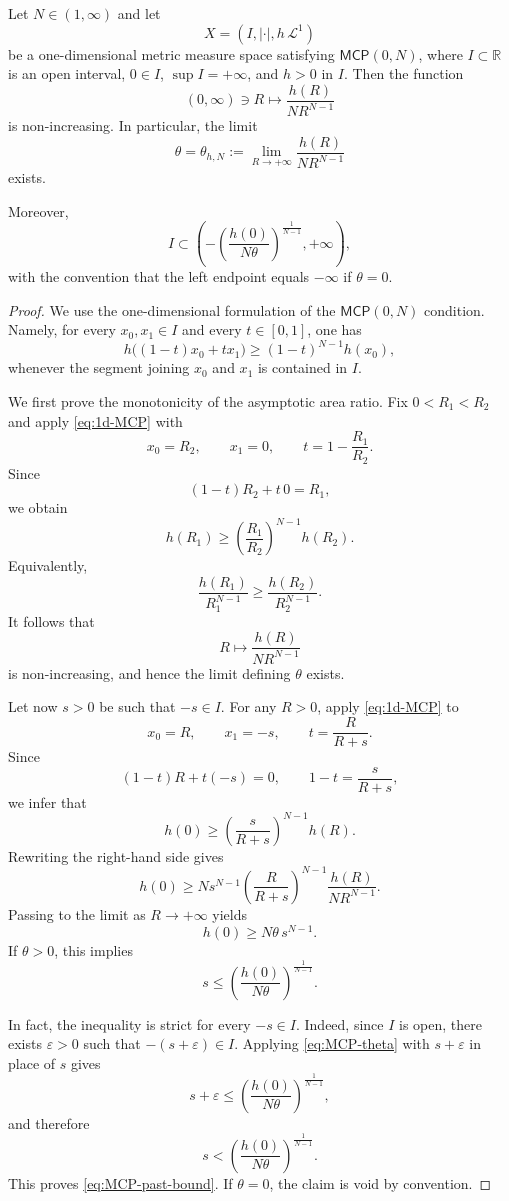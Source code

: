 \documentclass[10pt,a4paper]{amsart}
\newcommand{\MCP}{\mathsf{MCP}}
\begin{document}
\begin{lemma}\label{lem:MCP-asymptotic-bound}
Let $N\in(1,\infty)$ and let
\[
X=(I,|\cdot|,h\,\mathcal L^1)
\]
be a one-dimensional metric measure space satisfying $\MCP(0,N)$,
where $I\subset\mathbb R$ is an open interval, $0\in I$,
$\sup I=+\infty$, and $h>0$ in $I$.
Then the function
\[
(0,\infty)\ni R\longmapsto
\frac{h(R)}{N R^{N-1}}
\]
is non-increasing. In particular, the limit
\[
\theta=\theta_{h,N}
:=
\lim_{R\to+\infty}\frac{h(R)}{N R^{N-1}}
\]
exists.

Moreover,
\begin{equation}\label{eq:MCP-past-bound}
I\subset
\left(
-\left(\frac{h(0)}{N\theta}\right)^{\frac1{N-1}},
+\infty
\right),
\end{equation}
with the convention that the left endpoint equals $-\infty$ if
$\theta=0$.
\end{lemma}

\begin{proof}
We use the one-dimensional formulation of the $\MCP(0,N)$ condition.
Namely, for every $x_0,x_1\in I$ and every $t\in[0,1]$, one has
\begin{equation}\label{eq:1d-MCP}
h\bigl((1-t)x_0+t x_1\bigr)
\geq
(1-t)^{N-1}h(x_0),
\end{equation}
whenever the segment joining $x_0$ and $x_1$ is contained in $I$.

We first prove the monotonicity of the asymptotic area ratio. Fix
$0<R_1<R_2$ and apply \eqref{eq:1d-MCP} with
\[
x_0=R_2,\qquad x_1=0,
\qquad
t=1-\frac{R_1}{R_2}.
\]
Since
\[
(1-t)R_2+t\,0=R_1,
\]
we obtain
\[
h(R_1)
\geq
\left(\frac{R_1}{R_2}\right)^{N-1}h(R_2).
\]
Equivalently,
\[
\frac{h(R_1)}{R_1^{N-1}}
\geq
\frac{h(R_2)}{R_2^{N-1}}.
\]
It follows that
\[
R\longmapsto\frac{h(R)}{N R^{N-1}}
\]
is non-increasing, and hence the limit defining $\theta$ exists.

Let now $s>0$ be such that $-s\in I$. For any $R>0$, apply
\eqref{eq:1d-MCP} to
\[
x_0=R,\qquad x_1=-s,
\qquad
t=\frac{R}{R+s}.
\]
Since
\[
(1-t)R+t(-s)=0,
\qquad
1-t=\frac{s}{R+s},
\]
we infer that
\begin{equation}\label{eq:MCP-0-R}
h(0)
\geq
\left(\frac{s}{R+s}\right)^{N-1}h(R).
\end{equation}
Rewriting the right-hand side gives
\[
h(0)
\geq
N s^{N-1}
\left(\frac{R}{R+s}\right)^{N-1}
\frac{h(R)}{N R^{N-1}}.
\]
Passing to the limit as $R\to+\infty$ yields
\begin{equation}\label{eq:MCP-theta}
h(0)\geq N\theta\,s^{N-1}.
\end{equation}
If $\theta>0$, this implies
\[
s\leq
\left(\frac{h(0)}{N\theta}\right)^{\frac1{N-1}}.
\]

In fact, the inequality is strict for every $-s\in I$. Indeed, since
$I$ is open, there exists $\varepsilon>0$ such that
$-(s+\varepsilon)\in I$. Applying \eqref{eq:MCP-theta} with
$s+\varepsilon$ in place of $s$ gives
\[
s+\varepsilon
\leq
\left(\frac{h(0)}{N\theta}\right)^{\frac1{N-1}},
\]
and therefore
\[
s<
\left(\frac{h(0)}{N\theta}\right)^{\frac1{N-1}}.
\]
This proves \eqref{eq:MCP-past-bound}. If $\theta=0$, the claim is
void by convention.
\end{proof}
\end{document}
